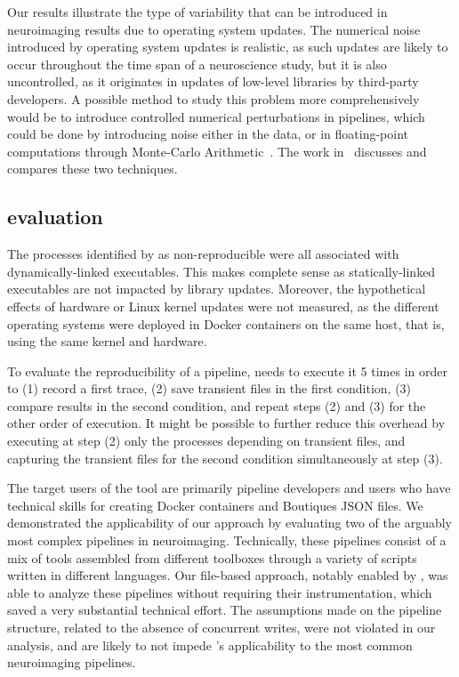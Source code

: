 Our results illustrate the type of variability that can be introduced in
 neuroimaging results due to operating system updates. The
 numerical noise introduced by operating system updates is realistic, as
 such updates are likely to occur throughout the time span of a
 neuroscience study, but it is also uncontrolled, as it originates in
 updates of low-level libraries by third-party developers. A possible
 method to study this problem more comprehensively would be to introduce
 controlled numerical perturbations in pipelines, which could be done by
 introducing noise either in the data, or in floating-point computations
 through Monte-Carlo Arithmetic~\cite{Parker1997-qq}. The work
 in~\cite{kiar2020comparing} discusses and compares these two techniques.

\subsection{\toolname evaluation}

The processes identified by \toolname as non-reproducible were all
associated with dynamically-linked executables.
This makes complete sense as statically-linked executables are not
impacted by library updates. Moreover, the hypothetical effects of
hardware or Linux kernel updates were not measured, as the different
operating systems were deployed in Docker containers on the same host, that
is, using the same kernel and hardware.

To evaluate the reproducibility of a pipeline, \toolname needs to execute it 5 times 
in order to (1) record a first \reprozip trace, (2) save transient files in the first condition, 
(3) compare results in the second condition, and repeat steps (2) and (3) for the other order of execution. 
It might be possible to further reduce this overhead by executing at step (2) only the processes 
depending on transient files, and capturing the transient files for the second condition simultaneously at step (3).

The target users of the \toolname tool are primarily pipeline developers and users who have 
technical skills for creating Docker containers and Boutiques JSON files.
We demonstrated the applicability of our approach by evaluating two of the
arguably most complex pipelines in neuroimaging. Technically, these
pipelines consist of a mix of tools assembled from different toolboxes
through a variety of scripts written in different languages. Our file-based
approach, notably enabled by \reprozip, was able to analyze these pipelines
without requiring their instrumentation, which saved a very substantial
technical effort. The assumptions made on the pipeline structure, related
to the absence of concurrent writes, were not violated in our analysis, and
are likely to not impede \toolname's applicability to the most common
neuroimaging pipelines.

